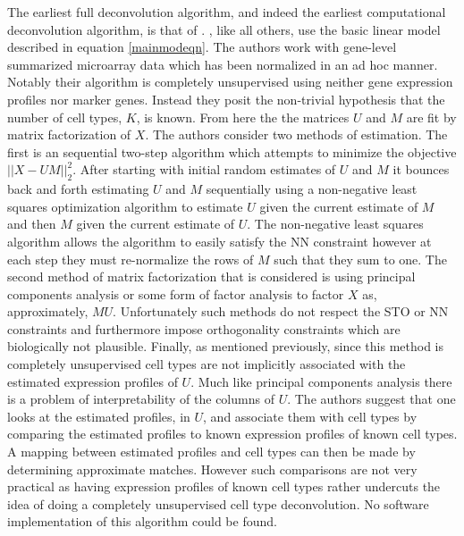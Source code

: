 \documentclass[reqno,12pt,oneside]{report}\usepackage[]{graphicx}\usepackage[]{color}
\theoremstyle{plain}
\theoremstyle{definition}
\theoremstyle{remark}
\numberwithin{theorem}{chapter}     %
\begin{document}
The earliest full deconvolution algorithm, and indeed the earliest computational deconvolution algorithm, is that of \cite{Venet2001}. \citeauthor{Venet2001}, like all others, use the basic linear model described in equation \ref{mainmodeqn}. The authors work with gene-level summarized microarray data which has been normalized in an ad hoc manner. Notably their algorithm is completely unsupervised using neither gene expression profiles nor marker genes. Instead they posit the non-trivial hypothesis that the number of cell types, $K$, is known. From here the the matrices $U$ and $M$ are fit by matrix factorization of $X$. The authors consider two methods of estimation. The first is an sequential two-step algorithm which attempts to minimize the objective $||X-UM||_2^2$. After starting with initial random estimates of $U$ and $M$ it bounces back and forth estimating $U$ and $M$ sequentially using a non-negative least squares optimization algorithm to estimate $U$ given the current estimate of $M$ and then $M$ given the current estimate of $U$. The non-negative least squares algorithm allows the algorithm to easily satisfy the NN constraint however at each step they must re-normalize the rows of $M$ such that they sum to one. The second method of matrix factorization that is considered is using principal components analysis or some form of factor analysis to factor $X$ as, approximately, $MU$. Unfortunately such methods do not respect the STO or NN constraints and furthermore impose orthogonality constraints which are biologically not plausible. Finally, as mentioned previously, since this method is completely unsupervised cell types are not implicitly associated with the estimated expression profiles of $U$. Much like principal components analysis there is a problem of interpretability of the columns of $U$. The authors suggest that one looks at the estimated profiles, in $U$, and associate them with cell types by comparing the estimated profiles to known expression profiles of known cell types. A mapping between estimated profiles and cell types can then be made by determining approximate matches. However such comparisons are not very practical as having expression profiles of known cell types rather undercuts the idea of doing a completely unsupervised cell type deconvolution. No software implementation of this algorithm could be found.
\end{document}
